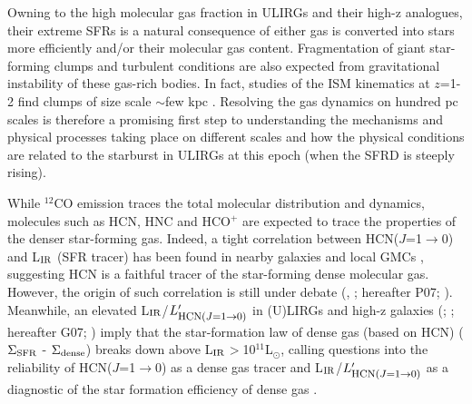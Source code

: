 \documentclass[12pt,a4paper]{article}  %
\newcommand{\comol}{$^{12}$CO\xspace}
\newcommand{\Lsun}{\mbox{L$_{\odot}$}\xspace}
\newcommand{\LIR}{\mbox{L$_{\rm IR}$}\xspace}
\newcommand{\rarr}{$\rightarrow$}
\newcommand{\ahcn}{\mbox{HCN($J$=1\rarr0)}\xspace}
\newcommand{\hcop}{HCO$^+$\xspace}
\newcommand{\Lp}[1][CO]{\mbox{$L^{\prime}_\textrm{\fontsize{8pt}{12pt}\selectfont{#1}}$}}
\begin{document}
Owning to the high molecular gas fraction in ULIRGs and their high-z analogues,
their extreme SFRs is a natural consequence of either gas is converted into stars
more efficiently and/or their molecular gas content. Fragmentation
of giant star-forming clumps and turbulent conditions are also expected 
from gravitational instability of these gas-rich bodies. 
In fact, studies of the ISM kinematics at $z$=1-2 find clumps of size scale
 $\sim$few kpc \citep{Swinbank12a, Swinbank12b}. 
Resolving the gas dynamics on hundred pc scales is therefore a promising first step
to understanding the mechanisms and physical processes taking
place on different scales and how the physical conditions 
are related to the starburst in ULIRGs at this epoch (when the SFRD is steeply rising).

While \comol emission traces the total molecular distribution and dynamics,
molecules such as HCN, HNC and \hcop are expected to trace the 
properties of the denser star-forming gas. Indeed, a tight correlation between \ahcn and \LIR 
(SFR tracer)
has been found in nearby galaxies
and local GMCs \citep{Wu05}, suggesting HCN is a faithful
tracer of the star-forming dense molecular gas. However, 
the origin of such correlation is still under debate  (\citealt{Kohno05a},  \citealt{Papadopoulos07a}; hereafter P07;  \citealt{Costagliola11a}).
Meanwhile, an elevated \LIR/\Lp[\ahcn] in (U)LIRGs and high-z galaxies (\citealt{Riechers07a}; \citealt{Gao07a}; hereafter G07; \citealt{GC08a}) imply that the star-formation law of dense gas (based on HCN) 
($\Sigma_{\rm SFR}$ - $\Sigma_{\rm dense}$) 
breaks down above \LIR $>$10$^{11}$\Lsun, calling questions into the reliability of 
\ahcn as a dense gas tracer and \LIR/\Lp[\ahcn] as a diagnostic of the star formation efficiency
of dense gas \citep{GC06a}. 
\end{document}

